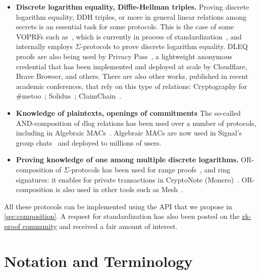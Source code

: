\documentclass[runningheads,11pt]{article}
\begin{document}
\begin{itemize}
  \item \textbf{Discrete logarithm equality, Diffie-Hellman triples.}
  Proving discrete logarithm equality, DDH triples, or more in general linear relations among secrets is an essential task for some protocols. This is the case of some VOPRFs such as~\cite{AC:JarKiaKra14},
  which is currently in process of standardization~\cite{cfrg-voprf}, and internally employs $\Sigma$-protocols to prove discrete logarithm equality.
  DLEQ proofs are also being used by Privacy Pass~\cite{PoPETS:DGSTV18}, a lightweight anonymous credential that has been implemented and deployed at scale by Cloudflare, Brave
  Browser, and others.
  There are also other works, published in recent academic conferences, that rely on this type of relations: Cryptography for \#metoo~\cite{PoPETS:KuyKraRab19}; Solidus~\cite{CCS:CZJKJS17}; ClaimChain~\cite{ClaimChain}.
  \item \textbf{Knowledge of plaintexts, openings of commitments}
  The so-called AND-composition of dlog relations has been used over a number of protocols,
  including in Algebraic MACs~\cite{CCS:ChaMeiZav14}.
  Algebraic MACs are now used in Signal's group chats~\cite{CCS:ChaPerZav20} and deployed to millions of users.
  \item \textbf{Proving knowledge of one among multiple discrete logarithms.}
  OR-composition of $\Sigma$-protocols
  has been used for range proofs~\cite{borromeansig}, and ring signatures: it enables for private transactions in CryptoNote (Monero)~\cite{monero}.
  OR-composition is also used in other tools such as Mesh~\cite{PoPETS:AlTGon19}.
\end{itemize}


All these protocols can be implemented using the API that we propose in \cref{sec:composition}.
A request for standardization has also been posted on the \href{https://community.zkproof.org/t/standardizing-sigma-protocols/471/}{zk-proof community} and received a fair amount of interest.

\section{Notation and Terminology}
\label{sec:notation}
\end{document}
